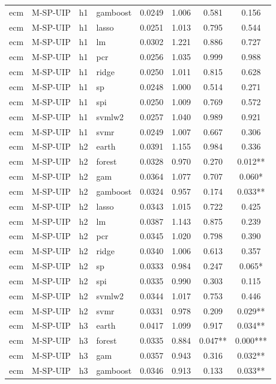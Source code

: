 \begin{ThreePartTable}
\begin{longtable}[t]{llclcccc}
ecm & M-SP-UIP & h1 & gamboost & 0.0249 & 1.006 & 0.581 & 0.156\\
ecm & M-SP-UIP & h1 & lasso & 0.0251 & 1.013 & 0.795 & 0.544\\
ecm & M-SP-UIP & h1 & lm & 0.0302 & 1.221 & 0.886 & 0.727\\
ecm & M-SP-UIP & h1 & pcr & 0.0256 & 1.035 & 0.999 & 0.988\\
ecm & M-SP-UIP & h1 & ridge & 0.0250 & 1.011 & 0.815 & 0.628\\
ecm & M-SP-UIP & h1 & sp & 0.0248 & 1.000 & 0.514 & 0.271\\
ecm & M-SP-UIP & h1 & spi & 0.0250 & 1.009 & 0.769 & 0.572\\
ecm & M-SP-UIP & h1 & svmlw2 & 0.0257 & 1.040 & 0.989 & 0.921\\
ecm & M-SP-UIP & h1 & svmr & 0.0249 & 1.007 & 0.667 & 0.306\\
\addlinespace
ecm & M-SP-UIP & h2 & earth & 0.0391 & 1.155 & 0.984 & 0.336\\
ecm & M-SP-UIP & h2 & forest & 0.0328 & 0.970 & 0.270 & 0.012**\\
ecm & M-SP-UIP & h2 & gam & 0.0364 & 1.077 & 0.707 & 0.060*\\
ecm & M-SP-UIP & h2 & gamboost & 0.0324 & 0.957 & 0.174 & 0.033**\\
ecm & M-SP-UIP & h2 & lasso & 0.0343 & 1.015 & 0.722 & 0.425\\
ecm & M-SP-UIP & h2 & lm & 0.0387 & 1.143 & 0.875 & 0.239\\
ecm & M-SP-UIP & h2 & pcr & 0.0345 & 1.020 & 0.798 & 0.390\\
ecm & M-SP-UIP & h2 & ridge & 0.0340 & 1.006 & 0.613 & 0.357\\
ecm & M-SP-UIP & h2 & sp & 0.0333 & 0.984 & 0.247 & 0.065*\\
ecm & M-SP-UIP & h2 & spi & 0.0335 & 0.990 & 0.303 & 0.115\\
ecm & M-SP-UIP & h2 & svmlw2 & 0.0344 & 1.017 & 0.753 & 0.446\\
ecm & M-SP-UIP & h2 & svmr & 0.0331 & 0.978 & 0.209 & 0.029**\\
\addlinespace
ecm & M-SP-UIP & h3 & earth & 0.0417 & 1.099 & 0.917 & 0.034**\\
ecm & M-SP-UIP & h3 & forest & 0.0335 & 0.884 & 0.047** & 0.000***\\
ecm & M-SP-UIP & h3 & gam & 0.0357 & 0.943 & 0.316 & 0.032**\\
ecm & M-SP-UIP & h3 & gamboost & 0.0346 & 0.913 & 0.133 & 0.033**\\

\end{longtable}
\end{ThreePartTable}
